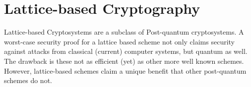 \section{Lattice-based Cryptography} 
Lattice-based Cryptosystems are a subclass of Post-quantum cryptosystems. A worst-case security proof for a lattice based scheme not only claims security against attacks from classical (current) computer systems, but quantum as well. The drawback is these not as efficient (yet) as other more well known schemes. However, lattice-based schemes claim a unique benefit that other post-quantum schemes do not. 



 
 






